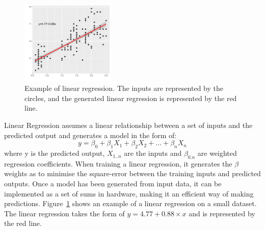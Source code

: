 \begin{figure}[t]
    \centering
    \includegraphics[width=0.40\textwidth]{background/graphics/lin_reg_ex.pdf}
    \caption{Example of linear regression. The inputs are represented by the circles, and the generated linear regression is represented by the red line.}
    \label{fig:linregex}
\end{figure}

Linear Regression assumes a linear relationship between a set of inputs and the predicted output and generates a model in the form of:
\begin{equation}
y = \beta_0 + \beta_1X_1 + \beta_2X_2 + ... + \beta_nX_n
\end{equation}
where y is the predicted output, $X_{1..n}$ are the inputs and $\beta_{0.n}$ are weighted regression coefficients.
When training a linear regression, it generates the $\beta$ weights as to minimise the square-error between the training inputs and predicted outputs.
Once a model has been generated from input data, it can be implemented as a set of sums in hardware, making it an efficient way of making predictions.
Figure~\ref{fig:linregex} shows an example of a linear regression on a small dataset.
The linear regression takes the form of $y=4.77 + 0.88 \times x$ and is represented by the red line.
\vspace{2em}
